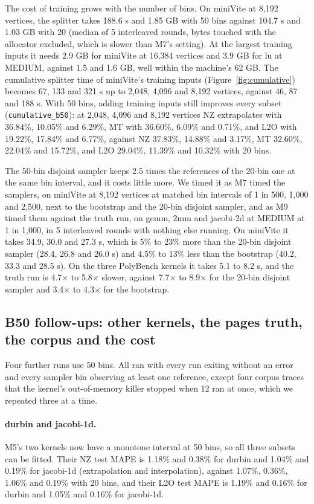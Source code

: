 \documentclass[11pt]{article}
\begin{document}
The cost of training grows with the number of bins. On miniVite at 8,192 vertices, the splitter takes 188.6 s and
1.85 GB with 50 bins against 104.7 s and 1.03 GB with 20 (median of 5 interleaved rounds, bytes touched with the
allocator excluded, which is slower than M7's setting). At the largest training inputs it needs 2.9 GB for miniVite
at 16,384 vertices and 3.9 GB for lu at MEDIUM, against 1.5 and 1.6 GB, well within the machine's 62 GB. The
cumulative splitter time of miniVite's training inputs (Figure~\ref{fig:cumulative}) becomes 67, 133 and 321 s up to
2,048, 4,096 and 8,192 vertices, against 46, 87 and 188 s. With 50 bins, adding training inputs still improves every
subset (\texttt{cumulative\_b50}): at 2,048, 4,096 and 8,192 vertices NZ extrapolates with 36.84\%, 10.05\% and 6.29\%,
MT with 36.60\%, 6.09\% and 0.71\%, and L2O with 19.22\%, 17.84\% and 6.77\%, against NZ 37.83\%, 14.88\% and 3.17\%,
MT 32.60\%, 22.04\% and 15.72\%, and L2O 29.04\%, 11.39\% and 10.32\% with 20 bins.

The 50-bin disjoint sampler keeps 2.5 times the references of the 20-bin one at the same bin interval, and it costs
little more. We timed it as M7 timed the samplers, on miniVite at 8,192 vertices at matched bin intervals of 1 in 500,
1,000 and 2,500, next to the bootstrap and the 20-bin disjoint sampler, and as M9 timed them against the truth run,
on gemm, 2mm and jacobi-2d at MEDIUM at 1 in 1,000, in 5 interleaved rounds with nothing else running. On miniVite
it takes 34.9, 30.0 and 27.3 s, which is 5\% to 23\% more than the 20-bin disjoint sampler (28.4, 26.8 and 26.0 s)
and 4.5\% to 13\% less than the bootstrap (40.2, 33.3 and 28.5 s). On the three PolyBench kernels it takes 5.1 to
8.2 s, and the truth run is 4.7$\times$ to 5.8$\times$ slower, against 7.7$\times$ to 8.9$\times$ for the 20-bin
disjoint sampler and 3.4$\times$ to 4.3$\times$ for the bootstrap.

\subsection{B50 follow-ups: other kernels, the pages truth, the corpus and the cost}
\label{sec:b50more}

Four further runs use 50 bins. All ran with every run exiting without an error and every sampler bin observing at
least one reference, except four corpus traces that the kernel's out-of-memory killer stopped when 12 ran at once,
which we repeated three at a time.

\paragraph{durbin and jacobi-1d.} M5's two kernels now have a monotone interval at 50 bins, so all three subsets can
be fitted. Their NZ test MAPE is 1.18\% and 0.38\% for durbin and 1.04\% and 0.19\% for jacobi-1d (extrapolation and
interpolation), against 1.07\%, 0.36\%, 1.06\% and 0.19\% with 20 bins, and their L2O test MAPE is 1.19\% and
0.16\% for durbin and 1.05\% and 0.16\% for jacobi-1d.
\end{document}
